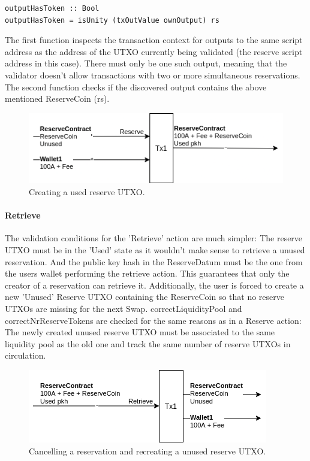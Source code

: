 \documentclass[a4paper,twoside,12pt]{report}
\begin{document}
\begin{itemize}
\begin{verbatim}
outputHasToken :: Bool
outputHasToken = isUnity (txOutValue ownOutput) rs
\end{verbatim}
The first function inspects the transaction context for outputs to the same script address as the address of the UTXO currently being validated (the reserve script address in this case). There must only be one such output, meaning that the validator doesn't allow transactions with two or more simultaneous reservations. The second function checks if the discovered output contains the above mentioned ReserveCoin (rs).  
\end{itemize}

\begin{figure}[H]
\centering
\includegraphics[scale=0.8]{reserve_def}
\caption{Creating a used reserve UTXO.}
\end{figure}

\paragraph{Retrieve}
The validation conditions for the 'Retrieve' action are much simpler: The reserve UTXO must be in the 'Used' state as it wouldn't make sense to retrieve a unused reservation. And the public key hash in the ReserveDatum must be the one from the users wallet performing the retrieve action. This guarantees that only the creator of a reservation can retrieve it. Additionally, the user is forced to create a new 'Unused' Reserve UTXO containing the ReserveCoin so that no reserve UTXOs are missing for the next Swap. 
correctLiquidityPool and correctNrReserveTokens are checked for the same reasons as in a Reserve action: The newly created unused reserve UTXO must be associated to the same liquidity pool as the old one and track the same number of reserve UTXOs in circulation.  

\begin{figure}[H]
\centering
\includegraphics[scale=0.8]{retrieve_def}
\caption{Cancelling a reservation and recreating a unused reserve UTXO.}
\end{figure}
\end{document}
